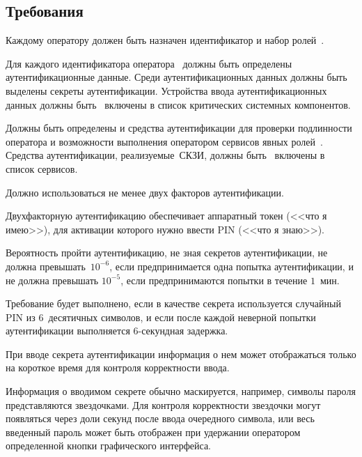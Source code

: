 \subsection{Требования}\label{IA.Reqs}

\label{R.IA.Id}
Каждому оператору должен быть назначен идентификатор и набор 
ролей~.

\label{R.IA.AuthData}
Для каждого идентификатора оператора~
должны быть определены аутентификационные данные. 
Среди аутентификационных данных должны быть выделены 
секреты аутентификации.
%
Устройства ввода аутентификационных данных должны быть~ 
включены в список критических системных компонентов. 

\label{R.IA.Auth}
Должны быть определены и  средства 
аутентификации для проверки подлинности оператора и возможности 
выполнения оператором сервисов явных ролей~.
%
Средства аутентификации, реализуемые~СКЗИ, 
должны быть~ включены в список сервисов.

\label{R.IA.2FA}
Должно использоваться не менее двух факторов аутентификации.

\begin{note}
Двухфакторную аутентификацию обеспечивает аппаратный токен (<<что я имею>>), 
для активации которого нужно ввести  PIN (<<что я знаю>>).
\end{note}

\label{R.IA.AuthStrength}
Вероятность пройти аутентификацию, 
не зная секретов аутентификации, 
не должна превышать~$10^{-6}$, 
если предпринимается одна попытка аутентификации, 
и не должна превышать $10^{-5}$, 
если предпринимаются попытки в течение $1$~мин.

\begin{note}
Требование будет выполнено, если в качестве секрета используется случайный PIN
из $6$~десятичных символов, и если после каждой неверной попытки аутентификации
выполняется $6$-секундная задержка.
\end{note}

\label{R.IA.PwdMask}
При вводе секрета аутентификации информация о нем может отображаться только на 
короткое время для контроля корректности ввода.

\begin{note}
Информация о вводимом секрете обычно маскируется, например, символы пароля
представляются звездочками. Для контроля корректности звездочки могут появляться
через доли секунд после ввода очередного символа, или весь введенный пароль может
быть отображен при удержании оператором определенной кнопки графического
интерфейса.
\end{note}

